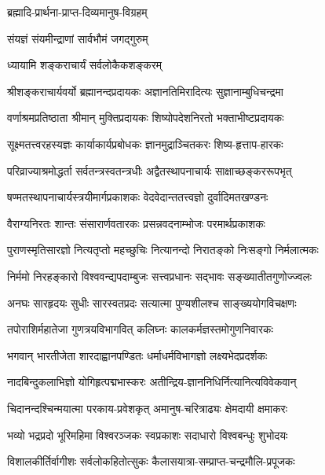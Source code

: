 

{ब्रह्मादि-प्रार्थना-प्राप्त-दिव्यमानुष-विग्रहम्}

{संयज्ञं संयमीन्द्राणां सार्वभौमं जगद्गुरुम्}

{ध्यायामि शङ्कराचार्यं सर्वलोकैकशङ्करम् }

\twolineshloka
{श्रीशङ्कराचार्यवर्यो ब्रह्मानन्दप्रदायकः}
{अज्ञानतिमिरादित्यः सुज्ञानाम्बुधिचन्द्रमा}

\twolineshloka
{वर्णाश्रमप्रतिष्ठाता श्रीमान् मुक्तिप्रदायकः}
{शिष्योपदेशनिरतो भक्ताभीष्टप्रदायकः}

\twolineshloka
{सूक्ष्मतत्त्वरहस्यज्ञः कार्याकार्यप्रबोधकः}
{ज्ञानमुद्राञ्चितकरः शिष्य-हृत्ताप-हारकः}

\twolineshloka
{परिव्राज्याश्रमोद्धर्ता सर्वतन्त्रस्वतन्त्रधीः}
{अद्वैतस्थापनाचार्यः साक्षाच्छङ्कररूपभृत्}

\twolineshloka
{षण्मतस्थापनाचार्यस्त्रयीमार्गप्रकाशकः}
{वेदवेदान्ततत्त्वज्ञो दुर्वादिमतखण्डनः}

\twolineshloka
{वैराग्यनिरतः शान्तः संसारार्णवतारकः}
{प्रसन्नवदनाम्भोजः परमार्थप्रकाशकः}

\twolineshloka
{पुराणस्मृतिसारज्ञो नित्यतृप्तो महच्छुचिः}
{नित्यानन्दो निरातङ्को निःसङ्गो निर्मलात्मकः}

\twolineshloka
{निर्ममो निरहङ्कारो विश्ववन्द्यपदाम्बुजः}
{सत्त्वप्रधानः सद्भावः सङ्ख्यातीतगुणोज्ज्वलः}

\twolineshloka
{अनघः सारहृदयः सुधीः सारस्वतप्रदः}
{सत्यात्मा पुण्यशीलश्च साङ्ख्ययोगविचक्षणः}

\twolineshloka
{तपोराशिर्महातेजा गुणत्रयविभागवित्}
{कलिघ्नः कालकर्मज्ञस्तमोगुणनिवारकः}

\twolineshloka
{भगवान् भारतीजेता शारदाह्वानपण्डितः}
{धर्माधर्मविभागज्ञो लक्ष्यभेदप्रदर्शकः}

\twolineshloka
{नादबिन्दुकलाभिज्ञो योगिहृत्पद्मभास्करः}
{अतीन्द्रिय-ज्ञाननिधिर्नित्यानित्यविवेकवान्}

\twolineshloka
{चिदानन्दश्चिन्मयात्मा परकाय-प्रवेशकृत्}
{अमानुष-चरित्राढ्यः क्षेमदायी क्षमाकरः}

\twolineshloka
{भव्यो भद्रप्रदो भूरिमहिमा विश्वरञ्जकः}
{स्वप्रकाशः सदाधारो विश्वबन्धुः शुभोदयः}

\twolineshloka
{विशालकीर्तिर्वागीशः सर्वलोकहितोत्सुकः}
{कैलासयात्रा-सम्प्राप्त-चन्द्रमौलि-प्रपूजकः}

